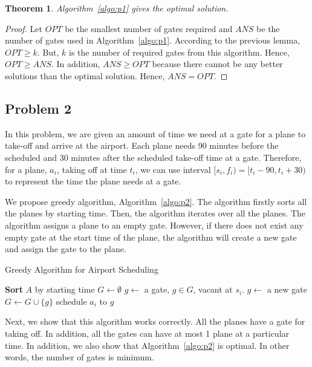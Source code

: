 \documentclass[11pt,a4paper]{article}
\newtheorem{theorem}{Theorem}[section]
\begin{document}
\begin{theorem}
Algorithm~\ref{algo:p1} gives the optimal solution.
\end{theorem}
\begin{proof}
Let $OPT$ be the smallest number of gates required and $ANS$ be the number of gates used in Algorithm~\ref{algo:p1}. According to the previous lemma, $OPT \geq k$. But, $k$ is the number of required gates from this algorithm. Hence, $OPT \geq ANS$. In addition, $ANS \geq OPT$ because there cannot be any better solutions than the optimal solution. Hence, $ANS = OPT$.
\end{proof}


\subsection{Problem 2}
\label{subsec:algo-prob2}
In this problem, we are given an amount of time we need at a gate for a plane to take-off and arrive at the airport. Each plane needs 90 minutes before the scheduled and 30 minutes after the scheduled take-off time at a gate. Therefore, for a plane, $a_i$, taking off at time $t_i$, we can use interval $[s_i, f_i) = [t_i-90, t_i+30)$ to represent the time the plane needs at a gate. \par
We propose greedy algorithm, Algorithm~\ref{algo:p2}. The algorithm firstly sorts all the planes by starting time. Then, the algorithm iterates over all the planes. The algorithm assigns a plane to an empty gate. However, if there does not exist any empty gate at the start time of the plane, the algorithm will create a new gate and assign the gate to the plane. \par

\begin{algorithm}
\caption{Greedy Algorithm for Airport Scheduling}\label{algo:p2}
\begin{algorithmic}
\STATE \textbf{Sort} $A$ by starting time
\STATE $G \gets \emptyset$
	\STATE $g \gets $ a gate, $g \in G$, vacant at $s_i$.
		\STATE $g \gets$ a new gate \label{algo:p2:newGate}
		\STATE $G \gets G \cup \{g\}$
	\ENDIF
	\STATE schedule $a_i$ to $g$ \label{algo:p2:schedule}
\ENDFOR
\end{algorithmic}
\end{algorithm}

Next, we show that this algorithm works correctly. All the planes have a gate for taking off. In addition, all the gates can have at most 1 plane at a particular time. In addition, we also show that Algorithm~\ref{algo:p2} is optimal. In other words, the number of gates is minimum.\par
\end{document}
